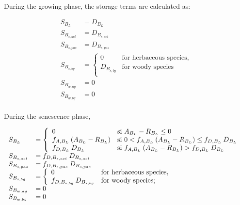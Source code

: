 {During the growing phase, the storage terms are calculated as:

\begin{equation}
\begin{array}{ll}
S_{B_L}       & = D_{B_L} \\
S_{B_{s,act}} & = D_{B_{s,act}} \\
S_{B_{s,pas}} & = D_{B_{s,pas}} \\
S_{B_{s,bg}}  & =    \left\{ 
  \begin{array}{ll}
    0 &  \mbox{for herbaceous species,} \\
    D_{B_{s,bg}} &  \mbox{for woody species} \\
  \end{array}
                  \right. \\
S_{B_{w,ag}}  & = 0 \\
S_{B_{w,bg}}  & = 0 \\
\end{array}
\label{eqstorcro}
\end{equation}

During the senescence phase,

\begin{equation}
\begin{array}{ll}
S_{B_L}       & =         \left\{ 
  \begin{array}{ll}
    0 & \mbox{si $ A_{B_L} - R_{B_L} \le 0 $} \\
    f_{A,B_L} \: (A_{B_L} - R_{B_L}) 
    & \mbox{si $ 0 < f_{A,B_L} \: (A_{B_L}-R_{B_L}) \le f_{D,B_L} \: D_{B_L} $ }\\
    f_{D,B_L} \: D_{B_L} 
    & \mbox{si $ f_{A,B_L} \: (A_{B_L}-R_{B_L}) > f_{D,B_L} \: D_{B_L} $ }\\
  \end{array}
                  \right. \\
S_{B_{s,act}} & = f_{D,B_{s,act}} \: D_{B_{s,act}} \\
S_{B_{s,pas}} & = f_{D,B_{s,pas}} \: D_{B_{s,pas}} \\
S_{B_{s,bg}}  & = \left\{ 
  \begin{array}{ll}
    0 &  \mbox{for herbaceous species,} \\
    f_{D,B_{s,bg}} \: D_{B_{s,bg}} &  \mbox{for woody species;} \\
  \end{array}
               \right. \\
S_{B_{w,ag}}  & = 0 \\
S_{B_{w,bg}}  & = 0 \\
\end{array}
\label{eqstorsen}
\end{equation}

}

